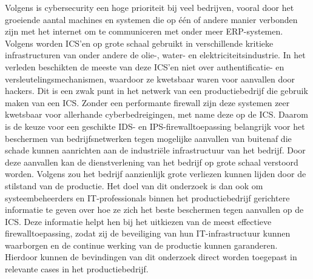 Volgens \textcite{pan2017} is cybersecurity een hoge prioriteit bij veel bedrijven, vooral door het groeiende aantal machines en systemen die op één of andere manier verbonden zijn met het internet om te communiceren met onder meer ERP-systemen.  Volgens \textcite{Lin2017} worden ICS'en op grote schaal gebruikt in verschillende kritieke infrastructuren van onder andere de olie-, water- en elektriciteitsindustrie. In het verleden beschikten de meeste van deze ICS'en niet over authentificatie- en versleutelingsmechanismen, waardoor ze kwetsbaar waren voor aanvallen door hackers. Dit is een zwak punt in het netwerk van een productiebedrijf die gebruik maken van een ICS. Zonder een performante firewall zijn deze systemen zeer kwetsbaar voor allerhande cyberbedreigingen, met name deze op de ICS. Daarom is de keuze voor een geschikte IDS- en IPS-firewalltoepassing belangrijk voor het beschermen van bedrijfsnetwerken tegen mogelijke aanvallen van buitenaf die schade kunnen aanrichten aan de industriële infrastructuur van het bedrijf. Door deze aanvallen kan de dienstverlening van het bedrijf op grote schaal verstoord worden. Volgens \textcite{Nwanya2017} zou het bedrijf aanzienlijk grote verliezen kunnen lijden door de stilstand van de productie. Het doel van dit onderzoek is dan ook om systeembeheerders en IT-professionals binnen het productiebedrijf gerichtere informatie te geven over hoe ze zich het beste beschermen tegen aanvallen op de ICS. Deze informatie helpt hen bij het uitkiezen van de meest effectieve firewalltoepassing, zodat zij de beveiliging van hun IT-infrastructuur kunnen waarborgen en de continue werking van de productie kunnen garanderen. Hierdoor kunnen de bevindingen van dit onderzoek direct worden toegepast in relevante cases in het productiebedrijf.


